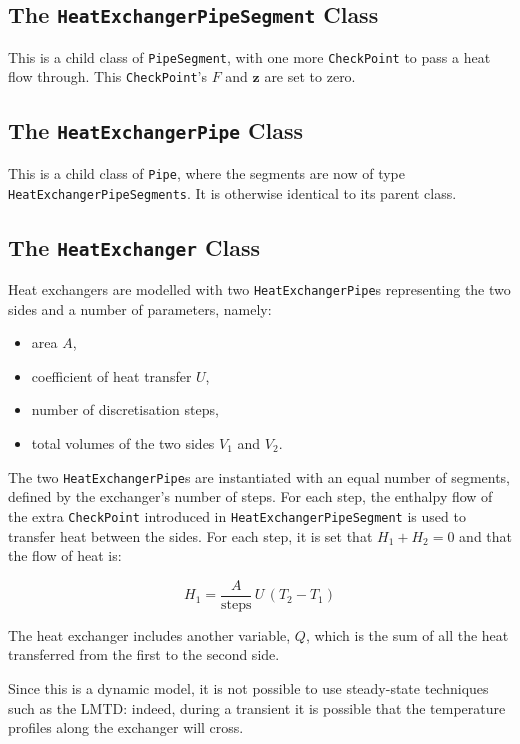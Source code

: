 \documentclass[a4paper]{article}
\begin{document}
\subsection{The \texttt{HeatExchangerPipeSegment} Class}
This is a child class of \texttt{PipeSegment}, with one more \texttt{CheckPoint}
to pass a heat flow through. This \texttt{CheckPoint}'s $F$ and $\mathbf{z}$ are
set to zero.


\subsection{The \texttt{HeatExchangerPipe} Class}
This is a child class of \texttt{Pipe}, where the segments are now of type
\texttt{HeatExchangerPipeSegments}. It is otherwise identical to its parent
class.


\subsection{The \texttt{HeatExchanger} Class}
Heat exchangers are modelled with two \texttt{HeatExchangerPipe}s representing
the two sides and a number of parameters, namely:

\begin{itemize}
\item area $A$,
\item coefficient of heat transfer $U$,
\item number of discretisation steps,
\item total volumes of the two sides $V_1$ and $V_2$.
\end{itemize}

The two \texttt{HeatExchangerPipe}s are instantiated with an equal number of
segments, defined by the exchanger's number of steps. For each step, the
enthalpy flow of the extra \texttt{CheckPoint} introduced in
\texttt{HeatExchangerPipeSegment} is used to transfer heat between the sides.
For each step, it is set that $H_1+H_2=0$ and that the flow of heat is:

\begin{equation}
H_1 = \frac{A}{\text{steps}}\,U\,(T_2-T_1)
\end{equation}

The heat exchanger includes another variable, $Q$, which is the sum of all the
heat transferred from the first to the second side.

Since this is a dynamic model, it is not possible to use steady-state techniques
such as the LMTD: indeed, during a transient it is possible that the temperature
profiles along the exchanger will cross.
\end{document}
